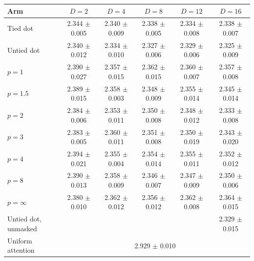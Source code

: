 \begin{tabular}{lccccc}
\toprule
Arm & $D=2$ & $D=4$ & $D=8$ & $D=12$ & $D=16$ \\
\midrule
Tied dot & 2.344 $\pm$ 0.005 & 2.340 $\pm$ 0.009 & 2.338 $\pm$ 0.005 & 2.334 $\pm$ 0.008 & 2.338 $\pm$ 0.007 \\
Untied dot & 2.340 $\pm$ 0.012 & 2.334 $\pm$ 0.010 & 2.327 $\pm$ 0.006 & 2.329 $\pm$ 0.006 & 2.325 $\pm$ 0.009 \\
$p=1$ & 2.390 $\pm$ 0.027 & 2.357 $\pm$ 0.015 & 2.362 $\pm$ 0.015 & 2.360 $\pm$ 0.007 & 2.357 $\pm$ 0.008 \\
$p=1.5$ & 2.389 $\pm$ 0.015 & 2.358 $\pm$ 0.003 & 2.348 $\pm$ 0.009 & 2.355 $\pm$ 0.014 & 2.345 $\pm$ 0.014 \\
$p=2$ & 2.384 $\pm$ 0.006 & 2.353 $\pm$ 0.011 & 2.350 $\pm$ 0.008 & 2.348 $\pm$ 0.012 & 2.333 $\pm$ 0.008 \\
$p=3$ & 2.383 $\pm$ 0.005 & 2.360 $\pm$ 0.011 & 2.351 $\pm$ 0.008 & 2.350 $\pm$ 0.019 & 2.343 $\pm$ 0.020 \\
$p=4$ & 2.394 $\pm$ 0.021 & 2.355 $\pm$ 0.004 & 2.354 $\pm$ 0.014 & 2.355 $\pm$ 0.011 & 2.352 $\pm$ 0.012 \\
$p=8$ & 2.390 $\pm$ 0.013 & 2.358 $\pm$ 0.009 & 2.346 $\pm$ 0.007 & 2.347 $\pm$ 0.009 & 2.350 $\pm$ 0.006 \\
$p=\infty$ & 2.380 $\pm$ 0.010 & 2.362 $\pm$ 0.012 & 2.356 $\pm$ 0.012 & 2.362 $\pm$ 0.008 & 2.364 $\pm$ 0.015 \\
\midrule
Untied dot, unmasked & \multicolumn{4}{c}{} & 2.329 $\pm$ 0.015 \\
Uniform attention & \multicolumn{5}{c}{2.929 $\pm$ 0.010} \\
\bottomrule
\end{tabular}

